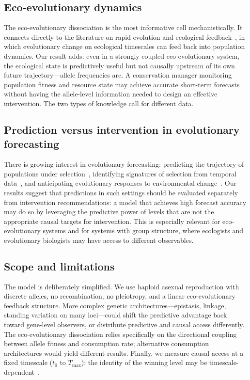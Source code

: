 \documentclass[11pt,a4paper]{article}
\newcommand{\Tfin}{T_{\max}}
\begin{document}
\subsection{Eco-evolutionary dynamics}

The eco-evolutionary dissociation is the most informative cell mechanistically.
It connects directly to the literature on rapid evolution and ecological
feedback~\citep{Yoshida2003, Hairston2005, Post2009, Ellner2011, Schoener2011},
in which evolutionary change on ecological timescales can feed back
into population dynamics.
Our result adds: even in a strongly coupled eco-evolutionary system,
the ecological state is predictively useful but not causally upstream
of its own future trajectory---allele frequencies are.
A conservation manager monitoring population fitness and resource state
may achieve accurate short-term forecasts without having the allele-level
information needed to design an effective intervention.
The two types of knowledge call for different data.

\subsection{Prediction versus intervention in evolutionary forecasting}

There is growing interest in evolutionary forecasting: predicting the
trajectory of populations under selection~\citep{Nosil2017, Gomulkiewicz2018},
identifying signatures of selection from temporal data~\citep{Foll2014,
Bollback2008}, and anticipating evolutionary responses to environmental
change~\citep{Chevin2010, Gomulkiewicz1995}.
Our results suggest that predictions in such settings should be
evaluated separately from intervention recommendations: a model that achieves
high forecast accuracy may do so by leveraging the predictive power of levels
that are not the appropriate causal targets for intervention.
This is especially relevant for eco-evolutionary systems and for systems with
group structure, where ecologists and evolutionary biologists may have access
to different observables.

\subsection{Scope and limitations}

The model is deliberately simplified.
We use haploid asexual reproduction with discrete alleles, no recombination,
no pleiotropy, and a linear eco-evolutionary feedback structure.
More complex genetic architectures---epistasis, linkage, standing variation
on many loci---could shift the predictive advantage back toward gene-level
observers, or distribute predictive and causal access differently.
The eco-evolutionary dissociation relies specifically on the directional
coupling between allele fitness and consumption rate; alternative consumption
architectures would yield different results.
Finally, we measure causal access at a fixed timescale ($t_0$ to $\Tfin$);
the identity of the winning level may be timescale-dependent~\citep{Krakauer2020}.
\end{document}
